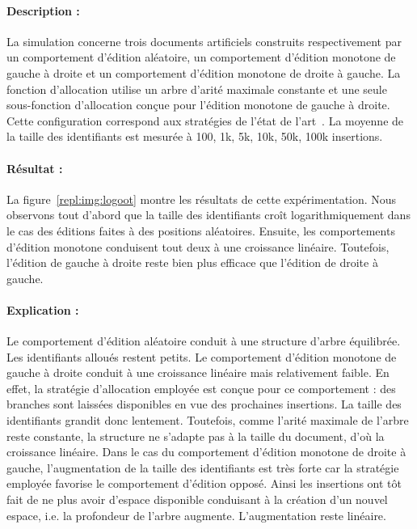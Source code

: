 \paragraph{Description :} La simulation concerne trois documents artificiels
construits respectivement par un comportement d'édition aléatoire, un
comportement d'édition monotone de gauche à droite et un comportement d'édition
monotone de droite à gauche. La fonction d'allocation utilise un arbre d'arité
maximale constante et une seule sous-fonction d'allocation conçue pour l'édition
monotone de gauche à droite. Cette configuration correspond aux stratégies de
l'état de l'art~\cite{preguica2009commutative, weiss2009logoot}.  La moyenne de
la taille des identifiants est mesurée à 100, 1k, 5k, 10k, 50k, 100k insertions.

\paragraph{Résultat :} La figure~\ref{repl:img:logoot} montre les résultats de
cette expérimentation. Nous observons tout d'abord que la taille des
identifiants croît logarithmiquement dans le cas des éditions faites à des
positions aléatoires. Ensuite, les comportements d'édition monotone conduisent
tout deux à une croissance linéaire. Toutefois, l'édition de gauche à droite
reste bien plus efficace que l'édition de droite à gauche.

\paragraph{Explication :} Le comportement d'édition aléatoire conduit à une
structure d'arbre équilibrée. Les identifiants alloués restent petits. Le
comportement d'édition monotone de gauche à droite conduit à une croissance
linéaire mais relativement faible. En effet, la stratégie d'allocation employée
est conçue pour ce comportement : des branches sont laissées disponibles en vue
des prochaines insertions. La taille des identifiants grandit donc
lentement. Toutefois, comme l'arité maximale de l'arbre reste constante, la
structure ne s'adapte pas à la taille du document, d'où la croissance
linéaire. Dans le cas du comportement d'édition monotone de droite à gauche,
l'augmentation de la taille des identifiants est très forte car la stratégie
employée favorise le comportement d'édition opposé. Ainsi les insertions ont tôt
fait de ne plus avoir d'espace disponible conduisant à la création d'un nouvel
espace, i.e. la profondeur de l'arbre augmente. L'augmentation reste linéaire.


